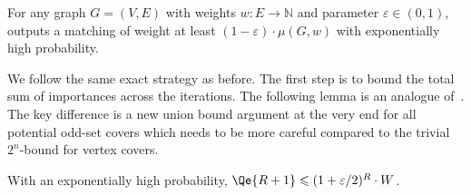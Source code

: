 \documentclass{theoretics}
\renewcommand{\leq}{\leqslant}
\newcommand{\eps}{\varepsilon}
\newcommand{\IN}{\mathbb{N}}
\begin{document}
\begin{theorem}\label{thm:alg-general}
	For any graph $G=(V,E)$ with weights $w: E \rightarrow \IN$ and parameter $\eps \in (0,1)$,  outputs a matching of weight at least $(1-\eps) \cdot \mu(G,w)$ with exponentially high probability. 
\end{theorem}

We follow the same exact strategy as before. The first step is to bound the total sum of importances across the iterations. The following lemma
is an analogue of~. The key difference is a new union bound argument at the very end
for all potential odd-set covers which needs to be more careful compared to the trivial $2^n$-bound for vertex covers. 

\begin{lemma}\label{lem:Qr-small-general}
	With an exponentially high probability, $\Qe{R+1} \leq (1+\eps/2)^{R} \cdot W$.   
\end{lemma}
\end{document}
